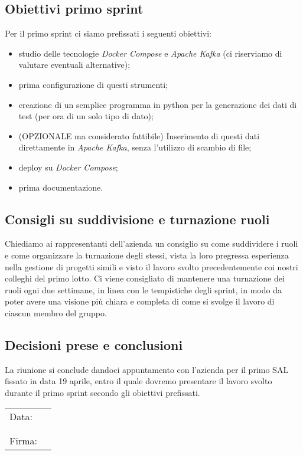 \documentclass[italian,12pt]{article}
\begin{document}
\subsection{Obiettivi primo sprint}
Per il primo sprint ci siamo prefissati i seguenti obiettivi:
\begin{itemize}
	\item studio delle tecnologie \textit{Docker Compose} e \textit{Apache Kafka} (ci riserviamo di valutare eventuali alternative);
	\item prima configurazione di questi strumenti;
	\item creazione di un semplice programma in python per la generazione dei dati di test (per ora di un solo tipo di dato);
	\item (OPZIONALE ma considerato fattibile) Inserimento di questi dati direttamente in \textit{Apache Kafka}, senza l'utilizzo di scambio di file;
	\item deploy su \textit{Docker Compose};
	\item prima documentazione.
\end{itemize}

\subsection{Consigli su suddivisione e turnazione ruoli}
Chiediamo ai rappresentanti dell'azienda un consiglio su come suddividere i ruoli e come 
organizzare la turnazione degli stessi, vista la loro pregressa esperienza nella gestione 
di progetti simili e visto il lavoro svolto precedentemente coi nostri colleghi del primo lotto. 
Ci viene consigliato di mantenere una turnazione dei ruoli ogni due settimane, in linea con 
le tempistiche degli sprint, in modo da poter avere una visione più chiara e completa di 
come si svolge il lavoro di ciascun membro del gruppo.

\subsection{Decisioni prese e conclusioni}
La riunione si conclude dandoci appuntamento con l'azienda per il primo SAL fissato 
in data 19 aprile, entro il quale dovremo presentare il lavoro svolto durante il primo sprint 
secondo gli obiettivi prefissati.

\begin{table}[b]
	\begin{tabular}{@{}p{.5in}p{4in}@{}}
		Data:  & \hrulefill \\
			   &     		\\
			   &     		\\
		Firma: & \hrulefill \\
	\end{tabular}
	\end{table}
\end{document}
